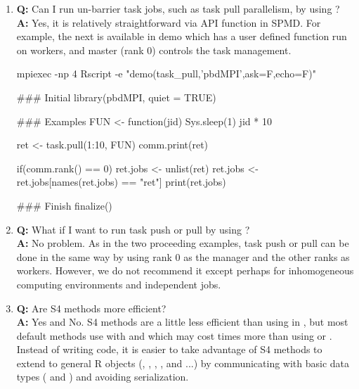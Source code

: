 \begin{enumerate}
\item {\bf\color{blue} Q:}
      Can I run un-barrier task jobs, such as task pull parallelism,
      by using ? \\
      {\bf\color{blue} A:}
      Yes, it is relatively straightforward via  API function
       in SPMD. For example, the next is available
      in demo which has a user
      defined function  run on workers, and master (rank 0)
      controls the task management.
\begin{Command}
mpiexec -np 4 Rscript -e "demo(task_pull,'pbdMPI',ask=F,echo=F)"
\end{Command}
\begin{Code}[title=SPMD R Script (task\_pull)]
### Initial
library(pbdMPI, quiet = TRUE)

### Examples
FUN <- function(jid){
  Sys.sleep(1)
  jid * 10
}

ret <- task.pull(1:10, FUN)
comm.print(ret)

if(comm.rank() == 0){
  ret.jobs <- unlist(ret)
  ret.jobs <- ret.jobs[names(ret.jobs) == "ret"]
  print(ret.jobs)
}

### Finish
finalize()
\end{Code}


\item {\bf\color{blue} Q:}
      What if I want to run task push or pull by using ? \\
      {\bf\color{blue} A:}
      No problem. As in the two proceeding examples, task push or pull
      can be done in the same way by using rank 0 as the manager and
      the other ranks as workers. However, we do not recommend it
      except perhaps for inhomogeneous computing environments and
      independent jobs.

\item {\bf\color{blue} Q:}
      Are S4 methods more efficient? \\
      {\bf\color{blue} A:}
      Yes and No. S4 methods are a little less efficient than using
       in , but most default
      methods use  with  and 
      which may cost  times more than using
       or .
      Instead of writing  code, it is easier to take
      advantage of S4 methods to extend to general R objects (,
      , , , and  ...)
      by communicating with basic data types
      ( and ) and avoiding serialization.


\end{enumerate}
